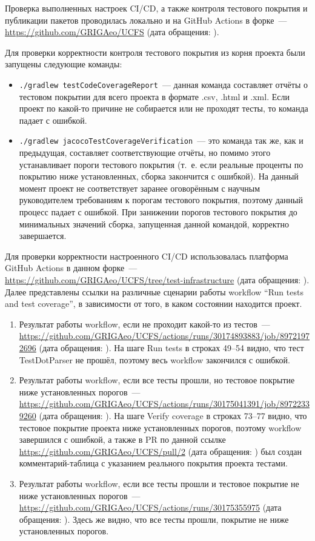 \documentclass[a4paper]{article}
\begin{document}
Проверка выполненных настроек CI/CD, а также контроля тестового покрытия и публикации пакетов проводилась локально и на GitHub Actions в форке~--- \url{https://github.com/GRIGAeo/UCFS} (дата обращения: ).

Для проверки корректности контроля тестового покрытия из корня проекта были запущены следующие команды:
\begin{itemize}
    \item \verb|./gradlew testCodeCoverageReport|~--- данная команда составляет отчёты о тестовом покрытии для всего проекта в формате .csv, .html и .xml. Если проект по какой-то причине не собирается или не проходят тесты, то команда падает с ошибкой.
    \item \verb|./gradlew jacocoTestCoverageVerification|~--- это команда так же, как и предыдущая, составляет соответствующие отчёты, но помимо этого устанавливает пороги тестового покрытия (т.~е. если реальные проценты по покрытию ниже установленных, сборка закончится с ошибкой). На данный момент проект не соответствует заранее оговорённым с научным руководителем требованиям к порогам тестового покрытия, поэтому данный процесс падает с ошибкой. При занижении порогов тестового покрытия до минимальных значений сборка, запущенная данной командой, корректно завершается.
\end{itemize}

Для проверки корректности настроенного CI/CD использовалась платформа GitHub Actions в данном форке~--- \url{https://github.com/GRIGAeo/UCFS/tree/test-infrastructure} (дата обращения: ). Далее представлены ссылки на различные сценарии работы workflow \foreignquote{english}{Run tests and test coverage}, в зависимости от того, в каком состоянии находится проект.

\begin{enumerate}
    \item Результат работы workflow, если не проходит какой-то из тестов~--- \url{https://github.com/GRIGAeo/UCFS/actions/runs/30174893883/job/89721972696} (дата обращения: ). На шаге Run tests в строках 49--54 видно, что тест TestDotParser не прошёл, поэтому весь workflow закончился с ошибкой.
    \item Результат работы workflow, если все тесты прошли, но тестовое покрытие ниже установленных порогов~--- \url{https://github.com/GRIGAeo/UCFS/actions/runs/30175041391/job/89722339260} (дата обращения: ). На шаге Verify coverage в строках 73--77 видно, что тестовое покрытие проекта ниже установленных порогов, поэтому workflow завершился с ошибкой, а также в PR по данной ссылке \url{https://github.com/GRIGAeo/UCFS/pull/2} (дата обращения: ) был создан комментарий-таблица с указанием реального покрытия проекта тестами.
    \item Результат работы workflow, если все тесты прошли и тестовое покрытие не ниже установленных порогов~--- \url{https://github.com/GRIGAeo/UCFS/actions/runs/30175355975} (дата обращения: ). Здесь же видно, что все тесты прошли, покрытие не ниже установленных порогов.
\end{enumerate}
\end{document}
